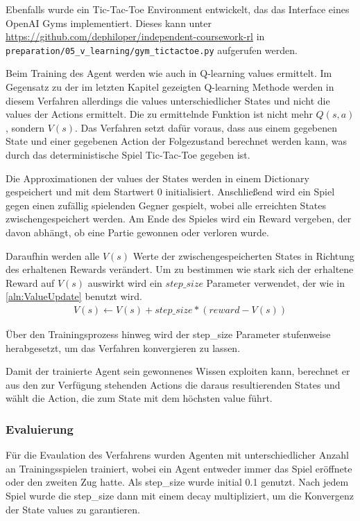 \documentclass[11pt]{scrartcl}
\begin{document}
Ebenfalls wurde ein Tic-Tac-Toe Environment entwickelt, das das Interface eines OpenAI
Gyms implementiert. Dieses kann unter
\url{https://github.com/dephiloper/independent-coursework-rl} in
\lstinline!preparation/05_v_learning/gym_tictactoe.py! aufgerufen werden.

Beim Training des Agent werden wie auch in Q-learning values ermittelt. Im Gegensatz zu
der im letzten Kapitel gezeigten Q-learning Methode werden in diesem Verfahren allerdings 
die values unterschiedlicher States und nicht die values der Actions ermittelt. Die zu
ermittelnde Funktion ist nicht mehr $Q(s, a)$, sondern $V(s)$. Das Verfahren setzt dafür
voraus, dass aus einem gegebenen State und einer gegebenen Action der Folgezustand berechnet
werden kann, was durch das deterministische Spiel Tic-Tac-Toe gegeben ist.

Die Approximationen der values der States werden in einem Dictionary gespeichert und mit
dem Startwert 0 initialisiert. Anschließend wird ein Spiel gegen einen zufällig spielenden
Gegner gespielt, wobei alle erreichten States zwischengespeichert werden. Am Ende des
Spieles wird ein Reward vergeben, der davon abhängt, ob eine Partie gewonnen oder verloren
wurde.

Daraufhin werden alle $V(s)$ Werte der zwischengespeicherten States in Richtung des
erhaltenen Rewards verändert. Um zu bestimmen wie stark sich der erhaltene Reward auf
$V(s)$ auswirkt wird ein $step\_size$ Parameter verwendet, der wie in 
\autoref{aln:ValueUpdate} benutzt wird.
\begin{align}
  V(s) \leftarrow V(s) + step\_size * (reward - V(s))
  \label{aln:ValueUpdate}
\end{align}
\noindent

Über den Trainingsprozess hinweg wird der step\_size Parameter stufenweise herabgesetzt,
um das Verfahren konvergieren zu lassen.

Damit der trainierte Agent sein gewonnenes Wissen exploiten kann, berechnet er aus den
zur Verfügung stehenden Actions die daraus resultierenden States und wählt die Action, die
zum State mit dem höchsten value führt.

\subsubsection{Evaluierung}
Für die Evaulation des Verfahrens wurden Agenten mit unterschiedlicher Anzahl an
Trainingsspielen trainiert, wobei ein Agent entweder immer das Spiel eröffnete oder
den zweiten Zug hatte. Als step\_size wurde initial 0.1 genutzt. Nach jedem Spiel wurde
die step\_size dann mit einem decay multipliziert, um die Konvergenz der State values
zu garantieren.
\end{document}
